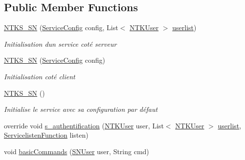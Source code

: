 \subsection*{Public Member Functions}
\begin{DoxyCompactItemize}
\item 
\mbox{\hyperlink{class_n_t_k_1_1_service_1_1_n_t_k_s___s_n_a919e7aa83cbe6508b3e05a4a5985e82b}{N\+T\+K\+S\+\_\+\+SN}} (\mbox{\hyperlink{struct_n_t_k_1_1_service_1_1_service_config}{Service\+Config}} config, List$<$ \mbox{\hyperlink{class_n_t_k_1_1_n_t_k_user}{N\+T\+K\+User}} $>$ \mbox{\hyperlink{class_n_t_k_1_1_service_1_1_n_t_k_service_a14977c798a805fea99802fa40da31aa0}{userlist}})
\begin{DoxyCompactList}\small\item\em Initialisation d\textquotesingle{}un service coté serveur \end{DoxyCompactList}\item 
\mbox{\hyperlink{class_n_t_k_1_1_service_1_1_n_t_k_s___s_n_a055734905fedff05e050d26e105aee55}{N\+T\+K\+S\+\_\+\+SN}} (\mbox{\hyperlink{struct_n_t_k_1_1_service_1_1_service_config}{Service\+Config}} config)
\begin{DoxyCompactList}\small\item\em Initialisation coté client \end{DoxyCompactList}\item 
\mbox{\hyperlink{class_n_t_k_1_1_service_1_1_n_t_k_s___s_n_a4dcb0163e4065b4e0595de63c83f4a0d}{N\+T\+K\+S\+\_\+\+SN}} ()
\begin{DoxyCompactList}\small\item\em Initialise le service avec sa configuration par défaut \end{DoxyCompactList}\item 
override void \mbox{\hyperlink{class_n_t_k_1_1_service_1_1_n_t_k_s___s_n_ad8969d9732dad1acb4db9b0a80d4c7be}{s\+\_\+authentification}} (\mbox{\hyperlink{class_n_t_k_1_1_n_t_k_user}{N\+T\+K\+User}} user, List$<$ \mbox{\hyperlink{class_n_t_k_1_1_n_t_k_user}{N\+T\+K\+User}} $>$ \mbox{\hyperlink{class_n_t_k_1_1_service_1_1_n_t_k_service_a14977c798a805fea99802fa40da31aa0}{userlist}}, \mbox{\hyperlink{namespace_n_t_k_1_1_service_a49f4581ae6fb3e9c155d034c47791db9}{Servicelisten\+Function}} listen)
\item 
void \mbox{\hyperlink{class_n_t_k_1_1_service_1_1_n_t_k_s___s_n_a89a0cae60bc215ccf7b021bb4539eb93}{basic\+Commands}} (\mbox{\hyperlink{class_n_t_k_1_1_service_1_1_s_n_user}{S\+N\+User}} user, String cmd)
\item 

\end{DoxyCompactItemize}
